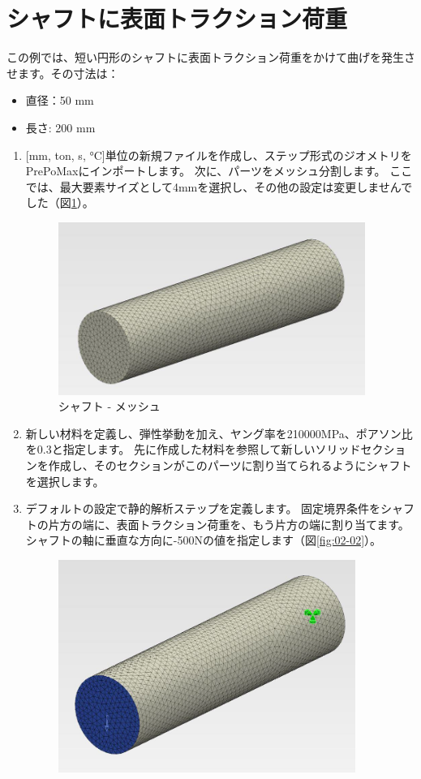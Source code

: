 \section{シャフトに表面トラクション荷重}
この例では、短い円形のシャフトに表面トラクション荷重をかけて曲げを発生させます。その寸法は：
\begin{itemize}
\item 直径：50 mm
\item 長さ: 200 mm
\end{itemize}
\begin{enumerate}
\item 
{[}mm, ton, s,  °C{]}単位の新規ファイルを作成し、ステップ形式のジオメトリをPrePoMaxにインポートします。
次に、パーツをメッシュ分割します。
ここでは、最大要素サイズとして4mmを選択し、その他の設定は変更しませんでした（図\ref{fig:02-01}）。
	\begin{figure}[H]
	\centering
	\includegraphics[width=100mm]{fig/02-01.png}
	\caption{シャフト - メッシュ}
	\label{fig:02-01}
	\end{figure}
\item
  新しい材料を定義し、弾性挙動を加え、ヤング率を210000MPa、ポアソン比を0.3と指定します。
  先に作成した材料を参照して新しいソリッドセクションを作成し、そのセクションがこのパーツに割り当てられるようにシャフトを選択します。
\item
  デフォルトの設定で静的解析ステップを定義します。
  固定境界条件をシャフトの片方の端に、表面トラクション荷重を、もう片方の端に割り当てます。
  シャフトの軸に垂直な方向に-500Nの値を指定します（図\ref{fig:02-02}）。
	\begin{figure}[H]
	\centering
	\includegraphics[width=97mm]{fig/02-02.png}

\end{figure}
\end{enumerate}
